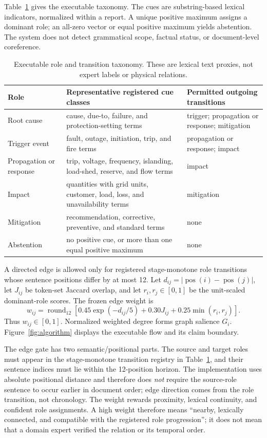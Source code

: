 \documentclass[applsci,article,submit,moreauthors]{Definitions/mdpi}
\begin{document}
Table~\ref{tab:taxonomy} gives the executable taxonomy. The cues are substring-based lexical indicators, normalized within a report. A unique positive maximum assigns a dominant role; an all-zero vector or equal positive maximum yields abstention. The system does not detect grammatical scope, factual status, or document-level coreference.

\begin{table}[H]
\caption{Executable role and transition taxonomy. These are lexical text proxies, not expert labels or physical relations.}
\label{tab:taxonomy}\centering\small
\begin{tabularx}{\textwidth}{p{2.2cm}XX}
\toprule
Role & Representative registered cue classes & Permitted outgoing transitions\\
\midrule
Root cause & cause, due-to, failure, and protection-setting terms & trigger; propagation or response; mitigation\\
Trigger event & fault, outage, initiation, trip, and fire terms & propagation or response; impact\\
Propagation or response & trip, voltage, frequency, islanding, load-shed, reserve, and flow terms & impact\\
Impact & quantities with grid units, customer, load, loss, and unavailability terms & mitigation\\
Mitigation & recommendation, corrective, preventive, and standard terms & none\\
Abstention & no positive cue, or more than one equal positive maximum & none\\
\bottomrule
\end{tabularx}
\end{table}

A directed edge is allowed only for registered stage-monotone role transitions whose sentence positions differ by at most 12. Let $d_{ij}=|\operatorname{pos}(i)-\operatorname{pos}(j)|$, let $J_{ij}$ be token-set Jaccard overlap, and let $r_i,r_j\in[0,1]$ be the unit-scaled dominant-role scores. The frozen edge weight is
\[
w_{ij}=\operatorname{round}_{12}\!\left[0.45\exp(-d_{ij}/5)+0.30J_{ij}+0.25\min(r_i,r_j)\right].
\]
Thus $w_{ij}\in[0,1]$. Normalized weighted degree forms graph salience $G_i$. Figure~\ref{fig:algorithm} displays the executable flow and its claim boundary.

The edge gate has two semantic/positional parts. The source and target roles must appear in the stage-monotone transition registry in Table~\ref{tab:taxonomy}, and their sentence indices must lie within the 12-position horizon. The implementation uses absolute positional distance and therefore does \emph{not} require the source-role sentence to occur earlier in document order; edge direction comes from the role transition, not chronology. The weight rewards proximity, lexical continuity, and confident role assignments. A high weight therefore means ``nearby, lexically connected, and compatible with the registered role progression''; it does not mean that a domain expert verified the relation or its temporal order.
\end{document}
